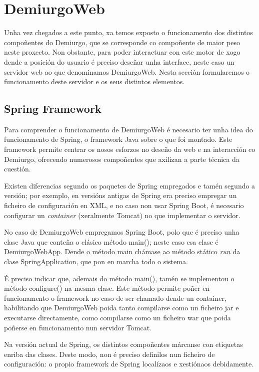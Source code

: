\section{DemiurgoWeb}
Unha vez chegados a este punto, xa temos exposto o funcionamento dos distintos
compoñentes do Demiurgo, que se corresponde co compoñente de maior peso neste
proxecto. Non obstante, para poder interactuar con este motor de xogo dende a
posición do usuario é preciso deseñar unha interface, neste caso un servidor web
ao que denominamos DemiurgoWeb. Nesta sección formularemos o funcionamento deste
servidor e os seus distintos elementos.

\subsection{Spring Framework}
Para comprender o funcionamento de DemiurgoWeb é necesario ter unha idea do
funcionamento de Spring, o framework Java sobre o que foi montado. Este
framework permite centrar os nosos esforzos no deseño da web e na interacción co
Demiurgo, ofrecendo numerosos compoñentes que axilizan a parte técnica da
cuestión.
\par
Existen diferencias segundo os paquetes de Spring empregados e tamén segundo a
versión; por exemplo, en versións antigas de Spring era preciso empregar un
ficheiro de configuración en XML, e no caso non usar Spring Boot, é necesario
configurar un \textit{container} (xeralmente Tomcat) no que implementar o
servidor.
\par
No caso de DemiurgoWeb empregamos Spring Boot, polo que é preciso unha clase
Java que conteña o clásico método main(); neste caso esa clase é DemiurgoWebApp.
Dende o método main chámase ao método stático \textit{run} da clase
SpringApplication, que pon en marcha todo o sistema.
\par
É preciso indicar que, ademais do método main(), tamén se implementou o método
configure() na mesma clase. Este método permite poñer en funcionamento o
framework no caso de ser chamado dende un container, habilitando que DemiurgoWeb
poida tanto compilarse como un ficheiro jar e executarse directamente, como
compilarse como un ficheiro war que poida poñerse en funcionamento nun
servidor Tomcat.
\par
Na versión actual de Spring, os distintos compoñentes márcanse con etiquetas
enriba das clases. Deste modo, non é preciso definilos nun ficheiro de
configuración: o propio framework de Spring localízaos e xestiónaos debidamente.

